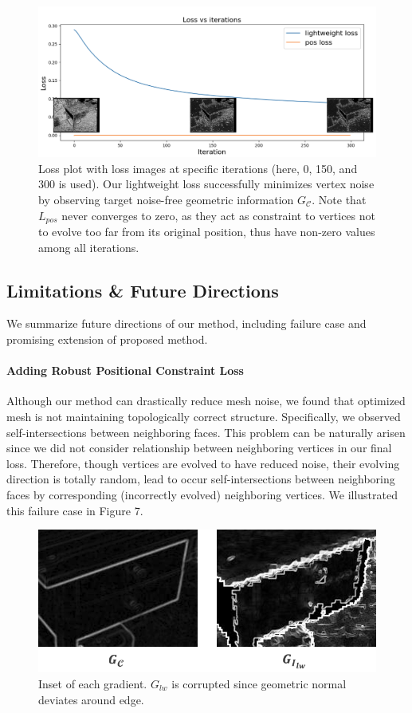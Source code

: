 \begin{figure}
    \includegraphics[width=\columnwidth]{figures/4_result_loss_plot_with_images.png}
    \caption{Loss plot with loss images at specific iterations (here, 0, 150, and 300 is used). Our lightweight loss successfully minimizes vertex noise by observing target noise-free geometric information $G_\mathcal{C}$. Note that $L_{pos}$ never converges to zero, as they act as constraint to vertices not to evolve too far from its original position, thus have non-zero values among all iterations.}
    \label{fig:six}
\end{figure}

\subsection{Limitations \& Future Directions}
We summarize future directions of our method, including failure case and promising extension of proposed method.

\paragraph{Adding Robust Positional Constraint Loss}
Although our method can drastically reduce mesh noise, we found that optimized mesh is not maintaining topologically correct structure. 
Specifically, we observed self-intersections between neighboring faces. 
This problem can be naturally arisen since we did not consider relationship between neighboring vertices in our final loss. 
Therefore, though vertices are evolved to have reduced noise, their evolving direction is totally random, lead to occur self-intersections between neighboring faces by corresponding (incorrectly evolved) neighboring vertices. 
We illustrated this failure case in Figure 7.


\begin{figure}
    \includegraphics[width=\columnwidth]{figures/4_future_edge_fitting.png}
    \caption{Inset of each gradient. $G_{lw}$ is corrupted since geometric normal deviates around edge.}
    \label{fig:eight}
\end{figure}



